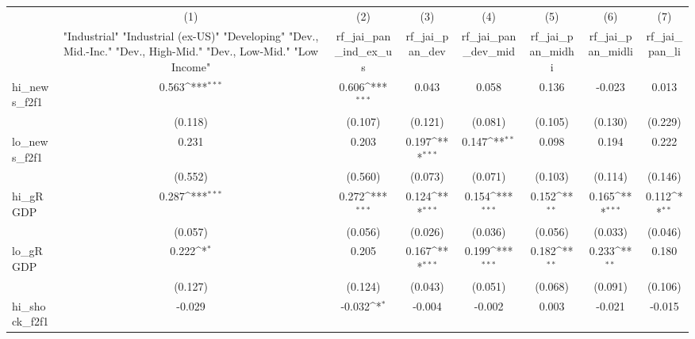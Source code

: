 {
\def\sym#1{\ifmmode^{#1}\else\(^{#1}\)\fi}
\begin{tabular}{l*{7}{c}}
\toprule
            &\multicolumn{1}{c}{(1)}&\multicolumn{1}{c}{(2)}&\multicolumn{1}{c}{(3)}&\multicolumn{1}{c}{(4)}&\multicolumn{1}{c}{(5)}&\multicolumn{1}{c}{(6)}&\multicolumn{1}{c}{(7)}\\
            &\multicolumn{1}{c}{ "Industrial" "Industrial (ex-US)" "Developing" "Dev., Mid.-Inc." "Dev., High-Mid."  "Dev., Low-Mid." "Low Income" }&\multicolumn{1}{c}{rf\_jai\_pan\_ind\_ex\_us}&\multicolumn{1}{c}{rf\_jai\_pan\_dev}&\multicolumn{1}{c}{rf\_jai\_pan\_dev\_mid}&\multicolumn{1}{c}{rf\_jai\_pan\_midhi}&\multicolumn{1}{c}{rf\_jai\_pan\_midli}&\multicolumn{1}{c}{rf\_jai\_pan\_li}\\
\midrule
hi\_news\_f2f1&       0.563\sym{***}&       0.606\sym{***}&       0.043         &       0.058         &       0.136         &      -0.023         &       0.013         \\
            &     (0.118)         &     (0.107)         &     (0.121)         &     (0.081)         &     (0.105)         &     (0.130)         &     (0.229)         \\
\addlinespace
lo\_news\_f2f1&       0.231         &       0.203         &       0.197\sym{***}&       0.147\sym{**} &       0.098         &       0.194         &       0.222         \\
            &     (0.552)         &     (0.560)         &     (0.073)         &     (0.071)         &     (0.103)         &     (0.114)         &     (0.146)         \\
\addlinespace
hi\_gRGDP    &       0.287\sym{***}&       0.272\sym{***}&       0.124\sym{***}&       0.154\sym{***}&       0.152\sym{**} &       0.165\sym{***}&       0.112\sym{**} \\
            &     (0.057)         &     (0.056)         &     (0.026)         &     (0.036)         &     (0.056)         &     (0.033)         &     (0.046)         \\
\addlinespace
lo\_gRGDP    &       0.222\sym{*}  &       0.205         &       0.167\sym{***}&       0.199\sym{***}&       0.182\sym{**} &       0.233\sym{**} &       0.180         \\
            &     (0.127)         &     (0.124)         &     (0.043)         &     (0.051)         &     (0.068)         &     (0.091)         &     (0.106)         \\
\addlinespace
hi\_shock\_f2f1&      -0.029         &      -0.032\sym{*}  &      -0.004         &      -0.002         &       0.003         &      -0.021         &      -0.015         \\

\end{tabular}}
